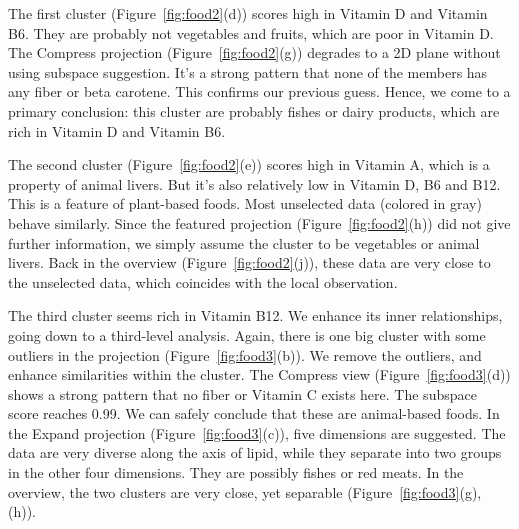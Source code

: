 The first cluster (Figure~\ref{fig:food2}(d)) scores high in Vitamin D and Vitamin B6. They are probably not vegetables and fruits, which are poor in Vitamin D. The Compress projection (Figure~\ref{fig:food2}(g)) degrades to a 2D plane without using subspace suggestion. It's a strong pattern that none of the members has any fiber or beta carotene. This confirms our previous guess. Hence, we come to a primary conclusion: this cluster are probably fishes or dairy products, which are rich in Vitamin D and Vitamin B6.

The second cluster (Figure~\ref{fig:food2}(e)) scores high in Vitamin A, which is a property of animal livers. But it's also relatively low in Vitamin D, B6 and B12. This is a feature of plant-based foods. Most unselected data (colored in gray) behave similarly. Since the featured projection (Figure~\ref{fig:food2}(h)) did not give further information, we simply assume the cluster to be vegetables or animal livers. Back in the overview (Figure~\ref{fig:food2}(j)), these data are very close to the unselected data, which coincides with the local observation.

The third cluster seems rich in Vitamin B12. We enhance its inner relationships, going down to a third-level analysis. Again, there is one big cluster with some outliers in the projection (Figure~\ref{fig:food3}(b)). We remove the outliers, and enhance similarities within the cluster. The Compress view (Figure~\ref{fig:food3}(d)) shows a strong pattern that no fiber or Vitamin C exists here. The subspace score reaches 0.99. We can safely conclude that these are animal-based foods. In the Expand projection (Figure~\ref{fig:food3}(c)), five dimensions are suggested. The data are very diverse along the axis of lipid, while they separate into two groups in the other four dimensions. They are possibly fishes or red meats. In the overview, the two clusters are very close, yet separable (Figure~\ref{fig:food3}(g), (h)).

